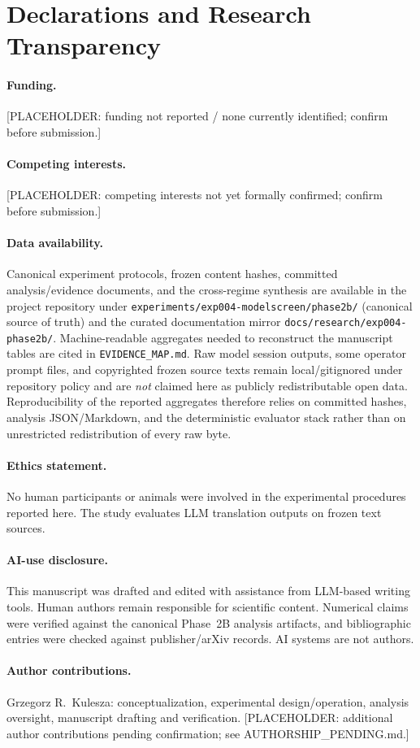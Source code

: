 \section*{Declarations and Research Transparency}
\label{sec:declarations}

\paragraph{Funding.}
[PLACEHOLDER: funding not reported / none currently identified; confirm before submission.]

\paragraph{Competing interests.}
[PLACEHOLDER: competing interests not yet formally confirmed; confirm before submission.]

\paragraph{Data availability.}
Canonical experiment protocols, frozen content hashes, committed analysis/evidence documents, and the cross-regime synthesis are available in the project repository under
\texttt{experiments/exp004-modelscreen/phase2b/}
(canonical source of truth) and the curated documentation mirror
\texttt{docs/research/exp004-phase2b/}.
Machine-readable aggregates needed to reconstruct the manuscript tables are cited in \texttt{EVIDENCE\_MAP.md}.
Raw model session outputs, some operator prompt files, and copyrighted frozen source texts remain local/gitignored under repository policy and are \emph{not} claimed here as publicly redistributable open data.
Reproducibility of the reported aggregates therefore relies on committed hashes, analysis JSON/Markdown, and the deterministic evaluator stack rather than on unrestricted redistribution of every raw byte.

\paragraph{Ethics statement.}
No human participants or animals were involved in the experimental procedures reported here.
The study evaluates LLM translation outputs on frozen text sources.

\paragraph{AI-use disclosure.}
This manuscript was drafted and edited with assistance from LLM-based writing tools.
Human authors remain responsible for scientific content.
Numerical claims were verified against the canonical Phase~2B analysis artifacts, and bibliographic entries were checked against publisher/arXiv records.
AI systems are not authors.

\paragraph{Author contributions.}
Grzegorz R.\ Kulesza: conceptualization, experimental design/operation, analysis oversight, manuscript drafting and verification.
[PLACEHOLDER: additional author contributions pending confirmation; see AUTHORSHIP\_PENDING.md.]
